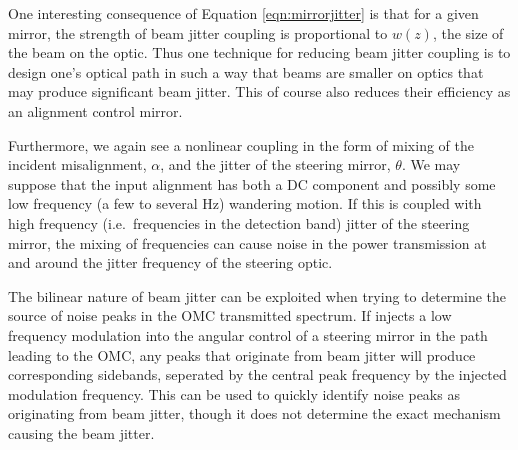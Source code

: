 One interesting consequence of Equation \ref{eqn:mirrorjitter} is that for a given mirror, the strength of beam jitter coupling is proportional to $w(z)$, the size of the beam on the optic. %
Thus one technique for reducing beam jitter coupling is to design one's optical path in such a way that beams are smaller on optics that may produce significant beam jitter. %
This of course also reduces their efficiency as an alignment control mirror.

Furthermore, we again see a nonlinear coupling in the form of mixing of the incident misalignment, $\alpha$, and the jitter of the steering mirror, $\theta$. %
We may suppose that the input alignment has both a DC component and possibly some low frequency (a few to several Hz) wandering motion. %
If this is coupled with high frequency (i.e.\ frequencies in the detection band) jitter of the steering mirror, the mixing of frequencies can cause noise in the power transmission at and around the jitter frequency of the steering optic.

The bilinear nature of beam jitter can be exploited when trying to determine the source of noise peaks in the OMC transmitted spectrum. %
If injects a low frequency modulation into the angular control of a steering mirror in the path leading to the OMC, any peaks that originate from beam jitter will produce corresponding sidebands, seperated by the central peak frequency by the injected modulation frequency. %
This can be used to quickly identify noise peaks as originating from beam jitter, though it does not determine the exact mechanism causing the beam jitter.

